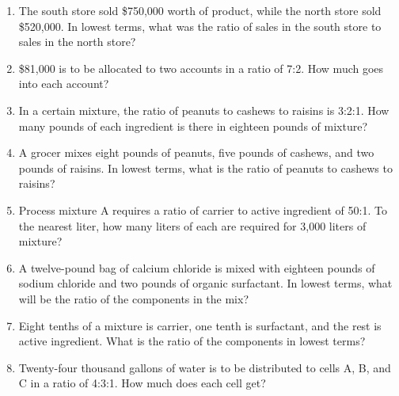 \documentclass[12pt]{article}
\begin{document}
\begin{enumerate}
\item The south store sold \$750,000 worth of product, while the north store sold \$520,000. In lowest terms, what was the ratio of sales in the south store to sales in the north store?
\spacing

\item \$81,000 is to be allocated to two accounts in a ratio of 7:2. How much goes into each account? 
\spacing 

\item In a certain mixture, the ratio of peanuts to cashews to raisins is 3:2:1. How many pounds of each ingredient is there in eighteen pounds of mixture?
\spacing

\item A grocer mixes eight pounds of peanuts, five pounds of cashews, and two pounds of raisins. In lowest terms, what is the ratio of peanuts to cashews to raisins?
\spacing

\item Process mixture A requires a ratio of carrier to active ingredient of 50:1. To the nearest liter, how many liters of each are required for 3,000 liters of mixture? 
\spacing

\item A twelve-pound bag of calcium chloride is mixed with eighteen pounds of sodium chloride and two pounds of organic surfactant. In lowest terms, what will be the ratio of the components in the mix?
\spacing

\item Eight tenths of a mixture is carrier, one tenth is surfactant, and the rest is active ingredient. What is the ratio of the components in lowest terms?
\spacing

\item Twenty-four thousand gallons of water is to be distributed to cells A, B, and C in a ratio of 4:3:1. How much does each cell get?
\spacing

\end{enumerate}
\end{document}
